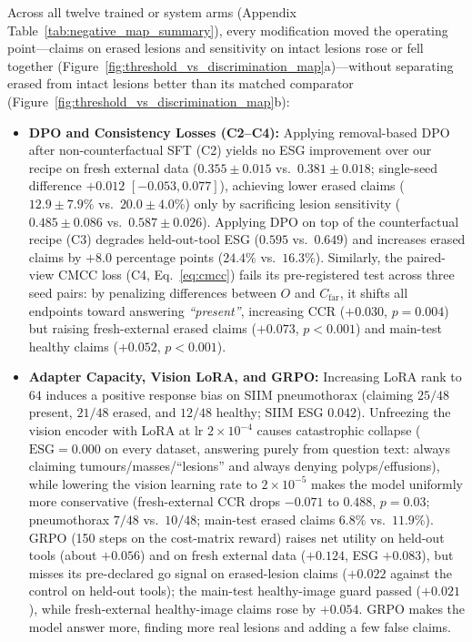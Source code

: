 \documentclass[5p,times,twocolumn,authoryear]{elsarticle}
\begin{document}
Across all twelve trained or system arms (Appendix Table~\ref{tab:negative_map_summary}), every modification moved the operating point---claims on erased lesions and sensitivity on intact lesions rose or fell together (Figure~\ref{fig:threshold_vs_discrimination_map}a)---without separating erased from intact lesions better than its matched comparator (Figure~\ref{fig:threshold_vs_discrimination_map}b):
\begin{itemize}[leftmargin=*,nosep]
    \item \textbf{DPO and Consistency Losses (C2--C4):} Applying removal-based DPO after non-counterfactual SFT (C2) yields no ESG improvement over our recipe on fresh external data ($0.355 \pm 0.015$ vs.\ $0.381 \pm 0.018$; single-seed difference $+0.012$ $[-0.053, 0.077]$), achieving lower erased claims ($12.9 \pm 7.9\%$ vs.\ $20.0 \pm 4.0\%$) only by sacrificing lesion sensitivity ($0.485 \pm 0.086$ vs.\ $0.587 \pm 0.026$). Applying DPO on top of the counterfactual recipe (C3) degrades held-out-tool ESG ($0.595$ vs.\ $0.649$) and increases erased claims by $+8.0$ percentage points ($24.4\%$ vs.\ $16.3\%$). Similarly, the paired-view CMCC loss (C4, Eq.~\ref{eq:cmcc}) fails its pre-registered test across three seed pairs: by penalizing differences between $O$ and $C_{\text{far}}$, it shifts all endpoints toward answering \emph{``present''}, increasing CCR ($+0.030$, $p=0.004$) but raising fresh-external erased claims ($+0.073$, $p<0.001$) and main-test healthy claims ($+0.052$, $p<0.001$).
    \item \textbf{Adapter Capacity, Vision LoRA, and GRPO:} Increasing LoRA rank to $64$ induces a positive response bias on SIIM pneumothorax (claiming $25/48$ present, $21/48$ erased, and $12/48$ healthy; SIIM ESG $0.042$). Unfreezing the vision encoder with LoRA at $\text{lr } 2\times 10^{-4}$ causes catastrophic collapse ($\text{ESG} = 0.000$ on every dataset, answering purely from question text: always claiming tumours/masses/``lesions'' and always denying polyps/effusions), while lowering the vision learning rate to $2\times 10^{-5}$ makes the model uniformly more conservative (fresh-external CCR drops $-0.071$ to $0.488$, $p=0.03$; pneumothorax $7/48$ vs.\ $10/48$; main-test erased claims $6.8\%$ vs.\ $11.9\%$). GRPO (150 steps on the cost-matrix reward) raises net utility on held-out tools (about $+0.056$) and on fresh external data ($+0.124$, ESG $+0.083$), but misses its pre-declared go signal on erased-lesion claims ($+0.022$ against the control on held-out tools); the main-test healthy-image guard passed ($+0.021$), while fresh-external healthy-image claims rose by $+0.054$. GRPO makes the model answer more, finding more real lesions and adding a few false claims.

\end{itemize}
\end{document}
